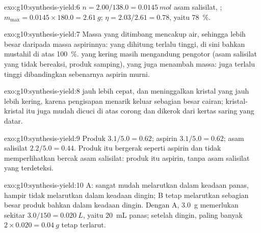 \begin{solution}{exo:g10:synthesis-yield:6}
$n = 2.00 / 138.0 = \qty{0.0145}{mol}$ asam salisilat, ; $m_{\max} = 0.0145 \times 180.0 = \qty{2.61}{g}$;
$\eta = 2.03 / 2.61 = 0.78$, yaitu \qty{78}{\percent}.
\end{solution}

\begin{solution}{exo:g10:synthesis-yield:7}
Massa yang ditimbang mencakup air, sehingga lebih besar daripada massa
aspirinnya:  yang dihitung terlalu tinggi, di sini bahkan
mustahil di atas \qty{100}{\percent}.  yang kering masih
mengandung pengotor (asam salisilat yang tidak bereaksi, produk
samping), yang juga menambah massa:  juga terlalu tinggi
dibandingkan  sebenarnya aspirin murni.
\end{solution}

\begin{solution}{exo:g10:synthesis-yield:8}
 jauh lebih cepat, dan meninggalkan kristal yang jauh
lebih kering, karena pengisapan menarik keluar sebagian besar cairan;
kristal-kristal itu juga mudah dicuci di atas corong dan dikerok dari
kertas saring yang datar.
\end{solution}

\begin{solution}{exo:g10:synthesis-yield:9}
Produk $3.1/5.0 = 0.62$; aspirin $3.1/5.0 = 0.62$; asam salisilat
$2.2/5.0 = 0.44$. Produk itu bergerak seperti aspirin dan tidak
memperlihatkan bercak asam salisilat: produk itu aspirin, tanpa asam
salisilat yang terdeteksi.
\end{solution}

\begin{solution}{exo:g10:synthesis-yield:10}
 A: sangat mudah melarutkan dalam keadaan panas, hampir tidak
melarutkan dalam keadaan dingin;  B tetap melarutkan sebagian
besar produk bahkan dalam keadaan dingin. Dengan A, \qty{3.0}{g}
memerlukan sekitar $3.0 / 150 = \qty{0.020}{L}$, yaitu \qty{20}{mL}
 panas; setelah dingin, paling banyak
$2 \times 0.020 = \qty{0.04}{g}$ tetap terlarut.
\end{solution}

